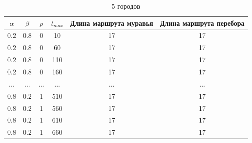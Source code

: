 \documentclass[a4paper,12pt]{article}
\begin{document}
\begin{table}[H]
    \centering
    \caption{5 городов}
    \label{table:city5}
    \begin{tabular}{|c|c|c|c|c|c|}
        \hline
        $\alpha$ & $\beta$ & $\rho$ & $t_{max}$ & Длина маршрута муравья & Длина маршрута перебора \\
        \hline
        0.2 & 0.8 & 0 & 10 & 17 & 17 \\
        0.2 & 0.8 & 0 & 60 & 17 & 17 \\
        0.2 & 0.8 & 0 & 110 & 17 & 17 \\
        0.2 & 0.8 & 0 & 160 & 17 & 17 \\
        ... & ... & ... & ... & ... & ... \\
        0.8 & 0.2 & 1 & 510 & 17 & 17 \\
        0.8 & 0.2 & 1 & 560 & 17 & 17 \\
        0.8 & 0.2 & 1 & 610 & 17 & 17 \\
        0.8 & 0.2 & 1 & 660 & 17 & 17 \\
        \hline
    \end{tabular}
\end{table}
\end{document}
